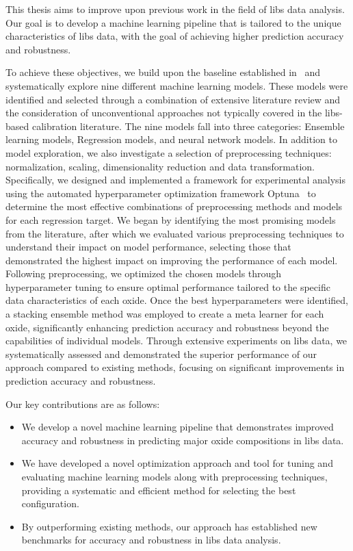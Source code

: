 This thesis aims to improve upon previous work in the field of \gls{libs} data analysis.
Our goal is to develop a machine learning pipeline that is tailored to the unique characteristics of \gls{libs} data, with the goal of achieving higher prediction accuracy and robustness.

To achieve these objectives, we build upon the baseline established in~\cite{p9_paper} and systematically explore nine different machine learning models. 
These models were identified and selected through a combination of extensive literature review and the consideration of unconventional approaches not typically covered in the \gls{libs}-based calibration literature.
The nine models fall into three categories: Ensemble learning models, Regression models, and neural network models. 
In addition to model exploration, we also investigate a selection of preprocessing techniques: normalization, scaling, dimensionality reduction and data transformation.
Specifically, we designed and implemented a framework for experimental analysis using the automated hyperparameter optimization framework Optuna~\cite{optuna} to determine the most effective combinations of preprocessing methods and models for each regression target.
We began by identifying the most promising models from the literature, after which we evaluated various preprocessing techniques to understand their impact on model performance, selecting those that demonstrated the highest impact on improving the performance of each model.
Following preprocessing, we optimized the chosen models through hyperparameter tuning to ensure optimal performance tailored to the specific data characteristics of each oxide.
Once the best hyperparameters were identified, a stacking ensemble method was employed to create a meta learner for each oxide, significantly enhancing prediction accuracy and robustness beyond the capabilities of individual models.
Through extensive experiments on \gls{libs} data, we systematically assessed and demonstrated the superior performance of our approach compared to existing methods, focusing on significant improvements in prediction accuracy and robustness.

Our key contributions are as follows:
\begin{itemize}
    \item We develop a novel machine learning pipeline that demonstrates improved accuracy and robustness in predicting major oxide compositions in \gls{libs} data.
    \item We have developed a novel optimization approach and tool for tuning and evaluating machine learning models along with preprocessing techniques, providing a systematic and efficient method for selecting the best configuration.
    \item By outperforming existing methods, our approach has established new benchmarks for accuracy and robustness in \gls{libs} data analysis.
\end{itemize}


